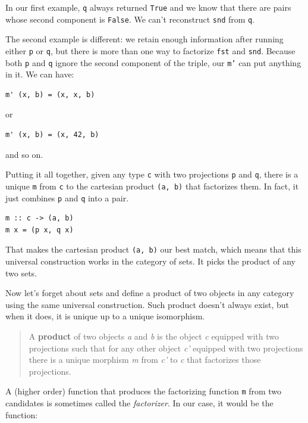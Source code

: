 In our first example, \texttt{q} always returned \texttt{True} and we
know that there are pairs whose second component is \texttt{False}. We
can't reconstruct \texttt{snd} from \texttt{q}.

The second example is different: we retain enough information after
running either \texttt{p} or \texttt{q}, but there is more than one way
to factorize \texttt{fst} and \texttt{snd}. Because both \texttt{p} and
\texttt{q} ignore the second component of the triple, our \texttt{m’}
can put anything in it. We can have:

\begin{verbatim}
m' (x, b) = (x, x, b)
\end{verbatim}

\noindent
or

\begin{verbatim}
m' (x, b) = (x, 42, b)
\end{verbatim}

\noindent
and so on.

Putting it all together, given any type \texttt{c} with two projections
\texttt{p} and \texttt{q}, there is a unique \texttt{m} from \texttt{c}
to the cartesian product \texttt{(a, b)} that factorizes them. In fact,
it just combines \texttt{p} and \texttt{q} into a pair.

\begin{verbatim}
m :: c -> (a, b)
m x = (p x, q x)
\end{verbatim}

That makes the cartesian product \texttt{(a, b)} our best match, which
means that this universal construction works in the category of sets. It
picks the product of any two sets.

Now let's forget about sets and define a product of two objects in any
category using the same universal construction. Such product doesn't
always exist, but when it does, it is unique up to a unique isomorphism.

\begin{quote}
A \textbf{product} of two objects \emph{a} and \emph{b} is the object
\emph{c} equipped with two projections such that for any other object
\emph{c'} equipped with two projections there is a unique morphism
\emph{m} from \emph{c'} to \emph{c} that factorizes those projections.
\end{quote}

A (higher order) function that produces the factorizing function
\texttt{m} from two candidates is sometimes called the
\emph{factorizer}. In our case, it would be the function:

